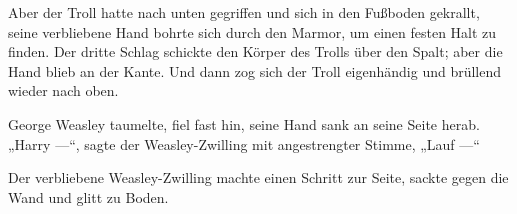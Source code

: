 
Aber der Troll hatte nach unten gegriffen und sich in den Fußboden gekrallt, seine verbliebene Hand bohrte sich durch den Marmor, um einen festen Halt zu finden. Der dritte Schlag schickte den Körper des Trolls über den Spalt; aber die Hand blieb an der Kante. Und dann zog sich der Troll eigenhändig und brüllend wieder nach oben.

George Weasley taumelte, fiel fast hin, seine Hand sank an seine Seite herab.
„Harry —“, sagte der Weasley-Zwilling mit angestrengter Stimme,
„Lauf —“

Der verbliebene Weasley-Zwilling machte einen Schritt zur Seite, sackte gegen die Wand und glitt zu Boden.

